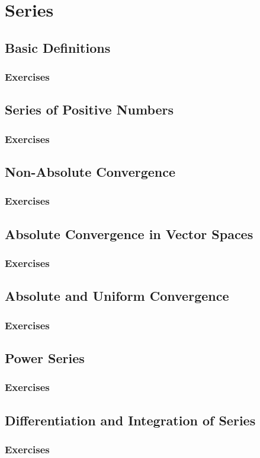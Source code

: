 \setcounter{chapter}{0}
\renewcommand{\thechapter}{9}
\chapter{Series}\label{ch:9}
\setcounter{equation}{0}	        %

\section{Basic Definitions}\label{sec:9.1}
\subsection*{Exercises}\label{sec:9.1_Exercises}
\section{Series of Positive Numbers}\label{sec:9.2}	
\subsection*{Exercises}\label{sec:9.2_Exercises}
\section{Non-Absolute Convergence}\label{sec:9.3}	
\subsection*{Exercises}\label{sec:9.3_Exercises}
\section{Absolute Convergence in Vector Spaces}\label{sec:9.4}	
\subsection*{Exercises}\label{sec:9.4_Exercises}
\section{Absolute and Uniform Convergence}\label{sec:9.5}	
\subsection*{Exercises}\label{sec:9.5_Exercises}
\section{Power Series}\label{sec:9.6}	
\subsection*{Exercises}\label{sec:9.6_Exercises}
\section{Differentiation and Integration of Series}\label{sec:9.7}	
\subsection*{Exercises}\label{sec:9.7_Exercises}
